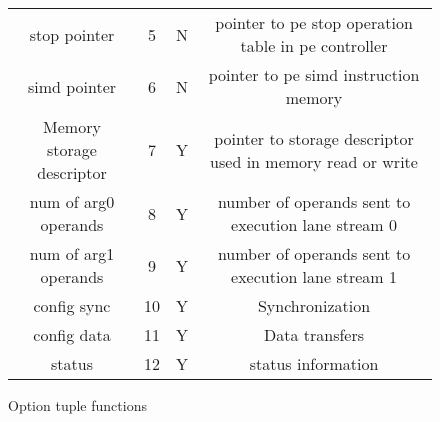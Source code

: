 \begin{figure}[!t]
\begin{minipage}{1\textwidth}
\begin{minipage}{0.85\textwidth}
\begin{adjustbox}{width=1\textwidth}
\begin{tabular}{ |c|c|c|c|  }
              \ac{stop} pointer                &    5   &  N&  pointer to \ac{pe} \ac{stop} operation table in \ac{pe} controller \\
              \ac{simd} pointer                &    6   &  N&  pointer to \ac{pe} \ac{simd} instruction memory  \\
              Memory storage descriptor        &    7   &  Y&  pointer to storage descriptor used in memory read or write \\
              num of arg0 operands             &    8   &  Y&  number of operands sent to execution lane stream 0\\
              num of arg1 operands             &    9   &  Y&  number of operands sent to execution lane stream 1\\
              config sync                      &   10   &  Y&  Synchronization \\
              config data                      &   11   &  Y&  Data transfers\\
              status                           &   12   &  Y&  status information \\
              \hline
            \end{tabular}
        \end{adjustbox}
        \caption{Option tuple functions}
        \label{tab:Option tuple functions}
    \end{minipage}
  \end{minipage}
\end{figure}


